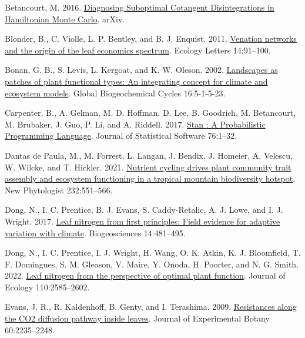 \documentclass[
  12pt,
  letterpaper,
  DIV=11,
  numbers=noendperiod]{scrartcl}
\newlength{\cslhangindent}
\newlength{\cslentryspacingunit} %
\newenvironment{CSLReferences}[2] %
 {%
  \setlength{\parindent}{0pt}
  \ifodd #1
  \let\oldpar\par
  \def\par{\hangindent=\cslhangindent\oldpar}
  \fi
  \setlength{\parskip}{#2\cslentryspacingunit}
 }%
 {}
\begin{document}
\hypertarget{refs}{}
\begin{CSLReferences}{1}{0}
\leavevmode{}%
Betancourt, M. 2016.
\href{https://doi.org/10.48550/arXiv.1604.00695}{Diagnosing {Suboptimal
Cotangent Disintegrations} in {Hamiltonian Monte Carlo}}. arXiv.

\leavevmode{}%
Blonder, B., C. Violle, L. P. Bentley, and B. J. Enquist. 2011.
\href{https://doi.org/10.1111/j.1461-0248.2010.01554.x}{Venation
networks and the origin of the leaf economics spectrum}. Ecology Letters
14:91--100.

\leavevmode{}%
Bonan, G. B., S. Levis, L. Kergoat, and K. W. Oleson. 2002.
\href{https://doi.org/10.1029/2000GB001360}{Landscapes as patches of
plant functional types: {An} integrating concept for climate and
ecosystem models}. Global Biogeochemical Cycles 16:5-1-5-23.

\leavevmode{}%
Carpenter, B., A. Gelman, M. D. Hoffman, D. Lee, B. Goodrich, M.
Betancourt, M. Brubaker, J. Guo, P. Li, and A. Riddell. 2017.
\href{https://doi.org/10.18637/jss.v076.i01}{Stan : {A Probabilistic
Programming Language}}. Journal of Statistical Software 76:1--32.

\leavevmode{}%
Dantas de Paula, M., M. Forrest, L. Langan, J. Bendix, J. Homeier, A.
Velescu, W. Wilcke, and T. Hickler. 2021.
\href{https://doi.org/10.1111/nph.17600}{Nutrient cycling drives plant
community trait assembly and ecosystem functioning in a tropical
mountain biodiversity hotspot}. New Phytologist 232:551--566.

\leavevmode{}%
Dong, N., I. C. Prentice, B. J. Evans, S. Caddy-Retalic, A. J. Lowe, and
I. J. Wright. 2017. \href{https://doi.org/10.5194/bg-14-481-2017}{Leaf
nitrogen from first principles: Field evidence for adaptive variation
with climate}. Biogeosciences 14:481--495.

\leavevmode{}%
Dong, N., I. C. Prentice, I. J. Wright, H. Wang, O. K. Atkin, K. J.
Bloomfield, T. F. Domingues, S. M. Gleason, V. Maire, Y. Onoda, H.
Poorter, and N. G. Smith. 2022.
\href{https://doi.org/10.1111/1365-2745.13967}{Leaf nitrogen from the
perspective of optimal plant function}. Journal of Ecology
110:2585--2602.

\leavevmode{}%
Evans, J. R., R. Kaldenhoff, B. Genty, and I. Terashima. 2009.
\href{https://doi.org/10.1093/jxb/erp117}{Resistances along the {CO2}
diffusion pathway inside leaves}. Journal of Experimental Botany
60:2235--2248.


\end{CSLReferences}
\end{document}
